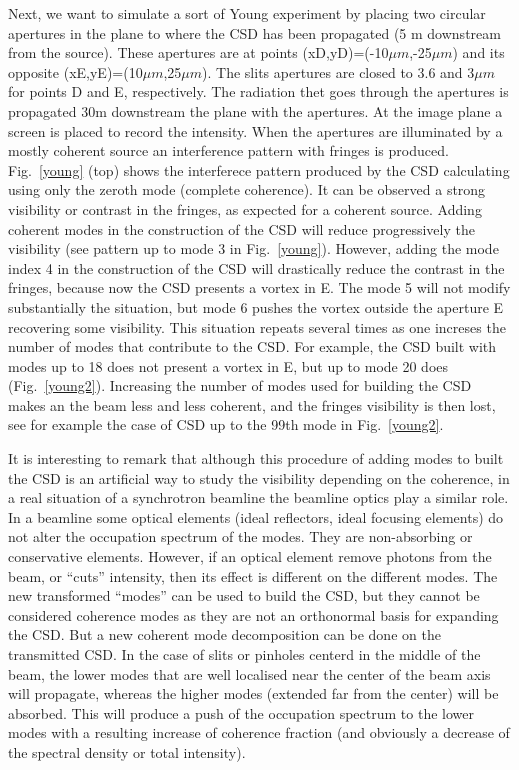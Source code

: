 \documentclass{iucr}              %
\begin{document}
Next, we want to simulate a sort of Young experiment by placing two circular apertures in the plane to where the CSD has been propagated (5 m downstream from the source). These apertures are at points (xD,yD)=(-10$\mu m$,-25$\mu m$) and its opposite (xE,yE)=(10$\mu m$,25$\mu m$). The slits apertures are closed to 3.6 and 3$\mu m$ for points D and E, respectively. The radiation thet goes through the apertures is propagated 30m downstream the plane with the apertures. At the image plane a screen is placed to record the intensity. When the apertures are illuminated by a mostly coherent source an interference pattern with fringes is produced. Fig.~\ref{young} (top) shows the interferece pattern produced by the CSD calculating using only the zeroth mode (complete coherence). It can be observed a strong visibility or contrast in the fringes, as expected for a coherent source. Adding coherent modes in the construction of the CSD will reduce progressively the visibility (see pattern up to mode 3 in Fig.~\ref{young}). However, adding the mode index 4 in the construction of the CSD will drastically reduce the contrast in the fringes, because now the CSD presents a vortex in E. The mode 5 will not modify substantially the situation, but mode 6 pushes the vortex outside the aperture E recovering some visibility. This situation repeats several times as one increses the number of modes that contribute to the CSD. For example, the CSD built with modes up to 18 does not present a vortex in E, but up to mode 20 does (Fig.~\ref{young2}). Increasing the number of modes used for building the CSD makes an the beam less and less coherent, and the fringes visibility is then lost, see for example the case of CSD up to the 99th mode in Fig.~\ref{young2}. 

It is interesting to remark that although this procedure of adding modes to built the CSD is an artificial way to study the visibility depending on the coherence, in a real situation of a synchrotron beamline the beamline optics play a similar role. In a beamline some optical elements (ideal reflectors, ideal focusing elements) do not alter the occupation spectrum of the modes. They are non-absorbing or conservative elements. However, if an optical element remove photons from the beam, or ``cuts'' intensity, then its effect is different on the different modes. The new transformed ``modes'' can be used to build the CSD, but they cannot be considered coherence modes as they are not an orthonormal basis for expanding the CSD. But a new coherent mode decomposition can be done on the transmitted CSD. In the case of slits or pinholes centerd in the middle of the beam, the lower modes that are well localised near the center of the beam axis will propagate, whereas the higher modes (extended far from the center) will be absorbed. This will produce a push of the occupation spectrum to the lower modes with a resulting increase of coherence fraction (and obviously a decrease of the spectral density or total intensity).     
\end{document}
